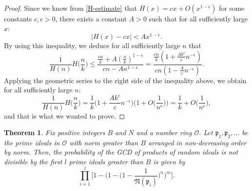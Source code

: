 \documentclass[12pt]{amsart}
\newtheorem{theorem}{Theorem}[subsection]
\theoremstyle{definition}
\begin{document}
\begin{proof}
	Since we know from \cref{H-estimate} that $H(x) = cx + O(x^{1-\epsilon})$ for some constants $c, \epsilon > 0$, there exists a constant $A > 0$ such that for all sufficiently large $x$:
	$$|H(x) - cx| < Ax^{1-\epsilon}.$$
	By using this inequality, we deduce for all sufficiently large $n$ that
	$$\frac{1}{H(n)} H\Big(\frac{n}{k}\Big) \leq \frac{\frac{cn}{k} + A(\frac{n}{k})^{1-\epsilon}}{cn - An^{1-\epsilon}} = \frac{\frac{cn}{k} (1 + \frac{Ak^{\epsilon}}{c} n^{-\epsilon})}{cn(1 - \frac{A}{c}n^{-\epsilon})}.$$
	Applying the geometric series to the right side of the inequality above, we obtain for all sufficiently large $n$:
	$$\frac{1}{H(n)} H\Big(\frac{n}{k}\Big) = \frac{1}{k} \Big(1 + \frac{Ak^{\epsilon}}{c} n^{-\epsilon}\Big) \Big(1 + O\Big(\frac{1}{n^{\epsilon}}\Big)\Big) = \frac{1}{k} + O\Big(\frac{1}{n^{\epsilon}}\Big),$$
	and that is what we wanted to prove.
\end{proof}

\begin{theorem}
	Fix positive integers $B$ and $N$ and a number ring $\mathcal{O}$. Let $\mathfrak{p}_1, \mathfrak{p}_2, ...$ be the prime ideals in $\mathcal{O}$ with norm greater than $B$ arranged in non-decreasing order by norm. Then, the probability of the GCD of products of random ideals is not divisible by the first $l$ prime ideals greater than $B$ is given by 
	$$\prod_{i=1}^{l} \Big[1 - \Big(1 - \Big(1-\frac{1}{\mathfrak{N}(\mathfrak{p}_i)}\Big)^n\Big)^m\Big].$$
\end{theorem}
\end{document}
